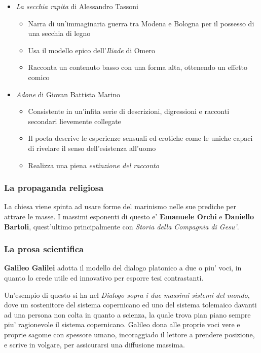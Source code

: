 \documentclass{article}
\begin{document}
{    \begin{itemize}
      \item \textit{La secchia rapita} di Alessandro Tassoni
      \begin{itemize}
        \item Narra di un'immaginaria guerra tra Modena e Bologna per il possesso di una secchia di legno
        \item Usa il modello epico dell'\textit{Iliade} di Omero
        \item Racconta un contenuto basso con una forma alta, ottenendo un effetto comico
      \end{itemize}
      \item \textit{Adone} di Giovan Battista Marino
      \begin{itemize}
        \item Consistente in un'infita serie di descrizioni, digressioni e racconti secondari lievemente collegate
        \item Il poeta descrive le esperienze sensuali ed erotiche come le uniche capaci di rivelare il senso dell'esistenza all'uomo
        \item Realizza una piena \textit{estinzione del racconto}
      \end{itemize}
    \end{itemize}

    \subsubsection{La propaganda religiosa}
    La chiesa viene spinta ad usare forme del marinismo nelle sue prediche per attrare le masse. I massimi esponenti di questo e' \textbf{Emanuele Orchi} e \textbf{Daniello Bartoli}, quest'ultimo principalmente con \textit{Storia della Compagnia di Gesu'}.

    \subsubsection{La prosa scientifica}
    \textbf{Galileo Galilei} adotta il modello del dialogo platonico a due o piu' voci, in quanto lo crede utile ed innovativo per esporre tesi contrastanti.

    Un'esempio di questo si ha nel \textit{Dialogo sopra i due massimi sistemi del mondo}, dove un sostenitore del sistema copernicano ed uno del sistema tolemaico davanti ad una persona non colta in quanto a scienza, la quale trova pian piano sempre piu' ragionevole il sistema copernicano. Galileo dona alle proprie voci vere e proprie sagome con spessore umano, incoraggiado il lettore a prendere posizione, e scrive in volgare, per assicurarsi una diffusione massima.

}
\end{document}
